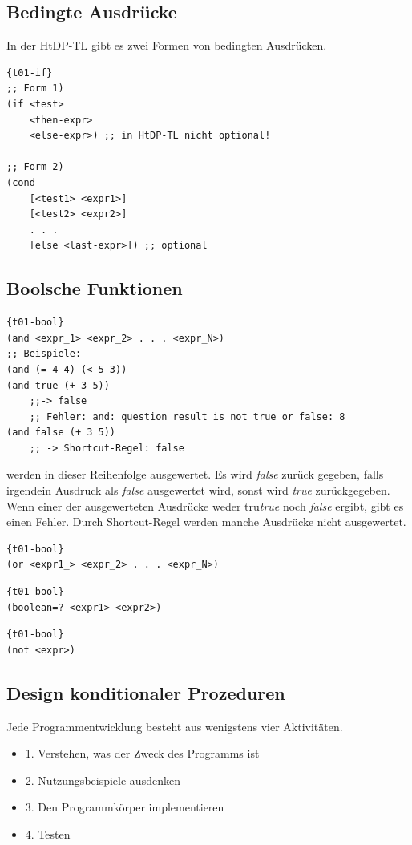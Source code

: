 \subsection{Bedingte Ausdrücke}
In der HtDP-TL gibt es zwei Formen von bedingten Ausdrücken.
\begin{lstlisting}{t01-if}
;; Form 1)
(if <test>
	<then-expr>
	<else-expr>) ;; in HtDP-TL nicht optional!

;; Form 2)
(cond
	[<test1> <expr1>]
	[<test2> <expr2>]
	. . .
	[else <last-expr>]) ;; optional
\end{lstlisting}

\subsection{Boolsche Funktionen}
\begin{lstlisting}{t01-bool}
(and <expr_1> <expr_2> . . . <expr_N>)
;; Beispiele:
(and (= 4 4) (< 5 3))
(and true (+ 3 5))
	;;-> false
 	;; Fehler: and: question result is not true or false: 8
(and false (+ 3 5))
	;; -> Shortcut-Regel: false
\end{lstlisting}
 werden in dieser Reihenfolge ausgewertet. Es wird \textit{false} zurück gegeben, falls irgendein Ausdruck als \textit{false} ausgewertet wird, sonst wird \textit{true} zurückgegeben. Wenn einer der ausgewerteten Ausdrücke weder tru\textit{true} noch \textit{false} ergibt, gibt es einen Fehler. Durch Shortcut-Regel werden manche Ausdrücke nicht ausgewertet.

\begin{lstlisting}{t01-bool}
(or <expr1_> <expr_2> . . . <expr_N>)
\end{lstlisting}

\begin{lstlisting}{t01-bool}
(boolean=? <expr1> <expr2>)
\end{lstlisting}

\begin{lstlisting}{t01-bool}
(not <expr>)
\end{lstlisting}

\subsection{Design konditionaler Prozeduren}
Jede Programmentwicklung besteht aus wenigstens vier Aktivitäten.
\begin{itemize}
	\item 1. Verstehen, was der Zweck des Programms ist
	\item 2.  Nutzungsbeispiele ausdenken
	\item 3.  Den Programmkörper implementieren
	\item 4.  Testen
\end{itemize}

